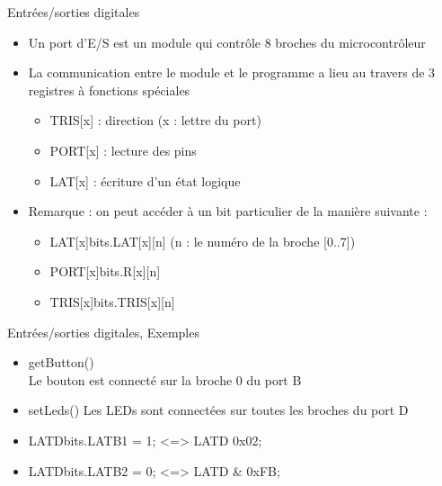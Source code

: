 \begin{frame}{Entrées/sorties digitales}

\begin{itemize}
\itemsep1pt\parskip0pt
\item
  Un port d'E/S est un module qui contrôle 8 broches du microcontrôleur
\item
  La communication entre le module et le programme a lieu au travers de
  3 registres à fonctions spéciales

  \begin{itemize}
  \itemsep1pt\parskip0pt
  \item
    TRIS{[}x{]} : direction (x : lettre du port)
  \item
    PORT{[}x{]} : lecture des pins
  \item
    LAT{[}x{]} : écriture d'un état logique
  \end{itemize}
\item
  Remarque : on peut accéder à un bit particulier de la manière suivante
  :

  \begin{itemize}
  \itemsep1pt\parskip0pt
  \item
    LAT{[}x{]}bits.LAT{[}x{]}{[}n{]} (n : le numéro de la broche
    {[}0..7{]})
  \item
    PORT{[}x{]}bits.R{[}x{]}{[}n{]}
  \item
    TRIS{[}x{]}bits.TRIS{[}x{]}{[}n{]}
  \end{itemize}
\end{itemize}

\end{frame}

\begin{frame}{Entrées/sorties digitales, Exemples}

\begin{itemize}
\item
  getButton()\\Le bouton est connecté sur la broche 0 du port B
\item
  setLeds() Les LEDs sont connectées sur toutes les broches du port D
\item
  LATDbits.LATB1 = 1; \textless{}=\textgreater{} LATD \textbar{} 0x02;
\item
  LATDbits.LATB2 = 0; \textless{}=\textgreater{} LATD \& 0xFB;
\end{itemize}

\end{frame}

